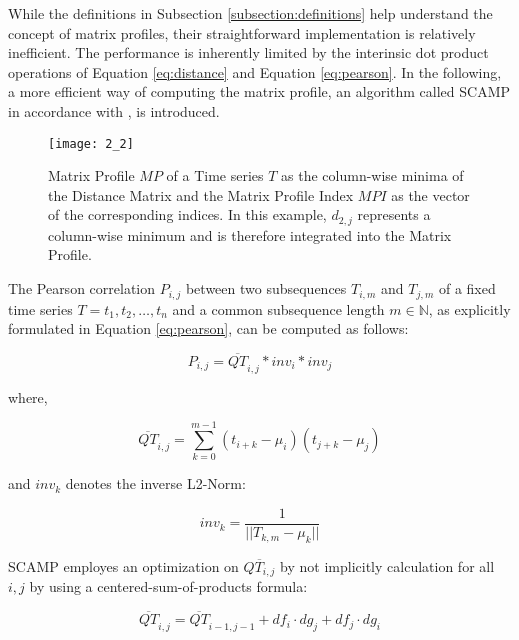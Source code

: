 While the definitions in Subsection \ref{subsection:definitions} help understand the concept of matrix profiles, their straightforward implementation is relatively inefficient. The performance is inherently limited by the interinsic dot product operations of Equation \ref{eq:distance} and Equation \ref{eq:pearson}. In the following, a more efficient way of computing the matrix profile, an algorithm called SCAMP in accordance with \cite{3}, is introduced.

\begin{figure}[h!]
    \texttt{[image: 2\_2]}
    \centering
    \caption{Matrix Profile $MP$ of a Time series $T$ as the column-wise minima of the Distance Matrix and the Matrix Profile Index $MPI$ as the vector of the corresponding indices. In this example, $d_{2,j}$ represents a column-wise minimum and is therefore integrated into the Matrix Profile.}
    \label{fig:matrix_profile}
\end{figure}

The Pearson correlation $P_{i,j}$ between two subsequences $T_{i,m}$ and $T_{j,m}$ of a fixed time series \( T = t_1, t_2, \dots, t_n \) and a common subsequence length \( m \in \mathbb{N} \), as explicitly formulated in Equation \ref{eq:pearson}, can be computed as follows:

\begin{equation}
    P_{i,j} = \overline{QT}_{i,j} * inv_i * inv_j
    \label{eq:pearson_calculation}
\end{equation}

where,

\begin{equation}
    \overline{QT}_{i,j} = \sum_{k=0}^{m-1}{\left(t_{i+k} - \mu_i\right)\left(t_{j+k} - \mu_j\right)}
    \label{eq:qt_i_j}
\end{equation}

and $inv_k$ denotes the inverse L2-Norm:

\begin{equation}
    inv_k = \frac{1}{||T_{k,m} - \mu_k||}
\end{equation}

SCAMP employes an optimization on $\overline{QT_{i,j}}$ by not implicitly calculation for all $i,j$ by using a centered-sum-of-products formula:

\begin{equation}
    \overline{QT}_{i,j} = \overline{QT}_{i-1,j-1} + df_i \cdot dg_j + df_j \cdot dg_i
    \label{eq:qt_next_row}
\end{equation}

